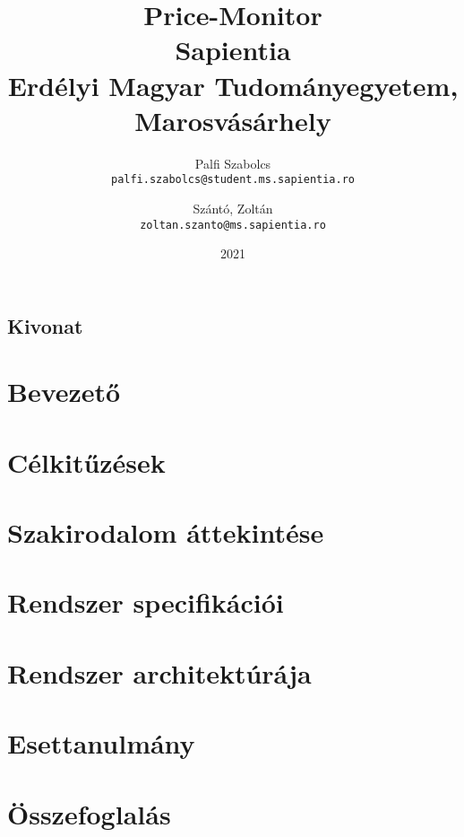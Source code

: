 \documentclass[12pt, twosides]{report}
\title{
	{Price-Monitor}\\
	{\large Sapientia\\
	Erdélyi Magyar Tudományegyetem, Marosvásárhely}
}
\author{
	Palfi Szabolcs\\
	\texttt{palfi.szabolcs@student.ms.sapientia.ro}
	\and
	Szántó, Zoltán\\
	\texttt{zoltan.szanto@ms.sapientia.ro}	
}
\date{2021}
\begin{document}
% 

% 

% 


\section*{Kivonat}

\pagebreak

% 



\tableofcontents

\listoffigures

\chapter{Bevezető}


\chapter{Célkitűzések}


\chapter{Szakirodalom áttekintése}


% 

\chapter{Rendszer specifikációi}


\chapter{Rendszer architektúrája}


\chapter{Esettanulmány}


\chapter{Összefoglalás}





% 
\end{document}
